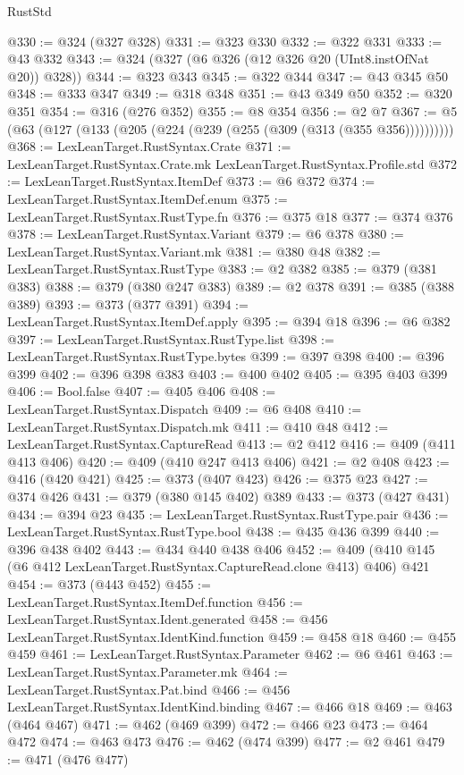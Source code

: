 \begin{lexlean}{RustStd}
\begin{coremodule}
@330 := @324 (@327 @328)
@331 := @323 @330
@332 := @322 @331
@333 := @43 @332
@343 := @324 (@327 (@6 @326 (@12 @326 @20 (UInt8.instOfNat @20)) @328))
@344 := @323 @343
@345 := @322 @344
@347 := @43 @345 @50
@348 := @333 @347
@349 := @318 @348
@351 := @43 @349 @50
@352 := @320 @351
@354 := @316 (@276 @352)
@355 := @8 @354
@356 := @2 @7
@367 := @5 (@63 (@127 (@133 (@205 (@224 (@239 (@255 (@309 (@313 (@355 @356))))))))))
@368 := LexLeanTarget.RustSyntax.Crate
@371 := LexLeanTarget.RustSyntax.Crate.mk LexLeanTarget.RustSyntax.Profile.std
@372 := LexLeanTarget.RustSyntax.ItemDef
@373 := @6 @372
@374 := LexLeanTarget.RustSyntax.ItemDef.enum
@375 := LexLeanTarget.RustSyntax.RustType.fn
@376 := @375 @18
@377 := @374 @376
@378 := LexLeanTarget.RustSyntax.Variant
@379 := @6 @378
@380 := LexLeanTarget.RustSyntax.Variant.mk
@381 := @380 @48
@382 := LexLeanTarget.RustSyntax.RustType
@383 := @2 @382
@385 := @379 (@381 @383)
@388 := @379 (@380 @247 @383)
@389 := @2 @378
@391 := @385 (@388 @389)
@393 := @373 (@377 @391)
@394 := LexLeanTarget.RustSyntax.ItemDef.apply
@395 := @394 @18
@396 := @6 @382
@397 := LexLeanTarget.RustSyntax.RustType.list
@398 := LexLeanTarget.RustSyntax.RustType.bytes
@399 := @397 @398
@400 := @396 @399
@402 := @396 @398 @383
@403 := @400 @402
@405 := @395 @403 @399
@406 := Bool.false
@407 := @405 @406
@408 := LexLeanTarget.RustSyntax.Dispatch
@409 := @6 @408
@410 := LexLeanTarget.RustSyntax.Dispatch.mk
@411 := @410 @48
@412 := LexLeanTarget.RustSyntax.CaptureRead
@413 := @2 @412
@416 := @409 (@411 @413 @406)
@420 := @409 (@410 @247 @413 @406)
@421 := @2 @408
@423 := @416 (@420 @421)
@425 := @373 (@407 @423)
@426 := @375 @23
@427 := @374 @426
@431 := @379 (@380 @145 @402) @389
@433 := @373 (@427 @431)
@434 := @394 @23
@435 := LexLeanTarget.RustSyntax.RustType.pair
@436 := LexLeanTarget.RustSyntax.RustType.bool
@438 := @435 @436 @399
@440 := @396 @438 @402
@443 := @434 @440 @438 @406
@452 := @409 (@410 @145 (@6 @412 LexLeanTarget.RustSyntax.CaptureRead.clone @413) @406) @421
@454 := @373 (@443 @452)
@455 := LexLeanTarget.RustSyntax.ItemDef.function
@456 := LexLeanTarget.RustSyntax.Ident.generated
@458 := @456 LexLeanTarget.RustSyntax.IdentKind.function
@459 := @458 @18
@460 := @455 @459
@461 := LexLeanTarget.RustSyntax.Parameter
@462 := @6 @461
@463 := LexLeanTarget.RustSyntax.Parameter.mk
@464 := LexLeanTarget.RustSyntax.Pat.bind
@466 := @456 LexLeanTarget.RustSyntax.IdentKind.binding
@467 := @466 @18
@469 := @463 (@464 @467)
@471 := @462 (@469 @399)
@472 := @466 @23
@473 := @464 @472
@474 := @463 @473
@476 := @462 (@474 @399)
@477 := @2 @461
@479 := @471 (@476 @477)

\end{coremodule}
\end{lexlean}
